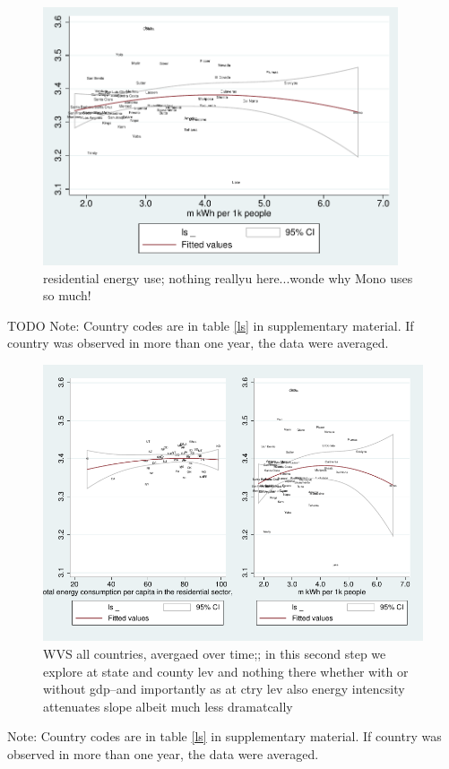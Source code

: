 \documentclass[10pt, letterpaper]{article}
\begin{document}
\begin{spacing}{1.4}
\begin{figure}[H]
 \includegraphics[height=3in]{graphsAndTables/lfELERESls.pdf}\centering
\caption{residential energy use; nothing reallyu here...wonde why Mono uses so much!}\label{}
\end{figure}
{\scriptsize TODO Note: Country codes are in table \ref{ls} in supplementary
  material. If country was observed in more than one year, the data were averaged.}

\begin{figure}[H]
 \includegraphics[width=6in]{graphsAndTables/stateCa.pdf}\centering
\caption{WVS all countries, avergaed over time;; in this second step we explore
at state and county lev and nothing there whether with or without gdp--and
importantly as at ctry lev also energy intencsity attenuates slope albeit much
less dramatcally}\label{stateCa}
 \end{figure} {\scriptsize Note: Country codes are in table \ref{ls} in supplementary material. If country was observed in more than one year, the data were averaged. }



\end{spacing}
\end{document}
